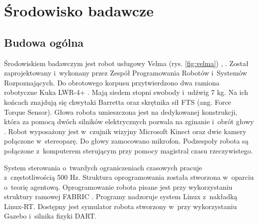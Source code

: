 
\chapter{Środowisko badawcze\label{chap:srodowisko}}
	\section{Budowa ogólna}
	Środowiskiem badawczym jest robot usługowy Velma (rys. \ref{fig:velma}) \cite{bib:velma2}, \cite{velma}. Został zaprojektowany i~wykonany przez Zespół Programowania Robotów i~Systemów Rozpoznających\cite{bib:robotyka}. Do obrotowego korpusu przytwierdzono dwa ramiona robotyczne Kuka LWR-4+\cite{bib:kukaPage} \cite{bib:kuka}. Mają siedem stopni swobody i~udźwig 7 kg. Na ich końcach znajdują się chwytaki Barretta\cite{bib:barrett}  oraz skrętnika sił FTS (ang. Force Torque Sensor). Głowa robota umieszczona jest na dedykowanej konstrukcji, która za pomocą dwóch silników elektrycznych pozwala na zginanie i~obrót głowy\cite{bib:velmaLeb} \cite{bib:velmaKorp}. Robot wyposażony jest w~czujnik wizyjny Microsoft Kinect oraz dwie kamery połączone w~stereoparę. Do głowy zamocowano mikrofon. Podzespoły robota są połączone z~komputerem sterującym przy pomocy magistral czasu rzeczywistego.
	
	System sterowania o~twardych ograniczeniach czasowych pracuje z~częstotliwością 500 Hz. Struktura oprogramowania została stworzona w~oparciu o~teorię agentową. Oprogramowanie robota pisane jest przy wykorzystaniu struktury ramowej FABRIC \cite{Seredynski-fabric-romoco-2019-twiki}. Programy nadzoruje system Linux z~nakładką Linux-RT. Dostępny jest symulator robota stworzony w~przy wykorzystaniu Gazebo i~silnika fizyki DART. 
	
